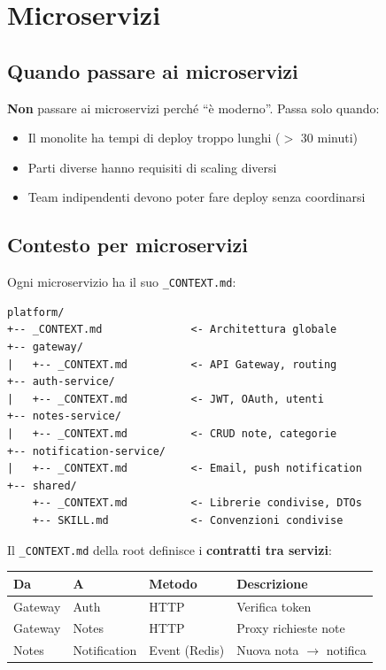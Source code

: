 \section{Microservizi}

\subsection{Quando passare ai microservizi}

\textbf{Non} passare ai microservizi perché ``è moderno''. Passa solo quando:
\begin{itemize}
  \item Il monolite ha tempi di deploy troppo lunghi ($>$ 30 minuti)
  \item Parti diverse hanno requisiti di scaling diversi
  \item Team indipendenti devono poter fare deploy senza coordinarsi
\end{itemize}

\subsection{Contesto per microservizi}

Ogni microservizio ha il suo \texttt{\_CONTEXT.md}:

\begin{lstlisting}[language={}]
platform/
+-- _CONTEXT.md              <- Architettura globale
+-- gateway/
|   +-- _CONTEXT.md          <- API Gateway, routing
+-- auth-service/
|   +-- _CONTEXT.md          <- JWT, OAuth, utenti
+-- notes-service/
|   +-- _CONTEXT.md          <- CRUD note, categorie
+-- notification-service/
|   +-- _CONTEXT.md          <- Email, push notification
+-- shared/
    +-- _CONTEXT.md          <- Librerie condivise, DTOs
    +-- SKILL.md             <- Convenzioni condivise
\end{lstlisting}

Il \texttt{\_CONTEXT.md} della root definisce i \textbf{contratti tra servizi}:

\begin{center}
\begin{tabularx}{\textwidth}{l l l X}
\toprule
\textbf{Da} & \textbf{A} & \textbf{Metodo} & \textbf{Descrizione} \\
\midrule
Gateway & Auth & HTTP & Verifica token \\
Gateway & Notes & HTTP & Proxy richieste note \\
Notes & Notification & Event (Redis) & Nuova nota $\rightarrow$ notifica \\
\bottomrule
\end{tabularx}
\end{center}

